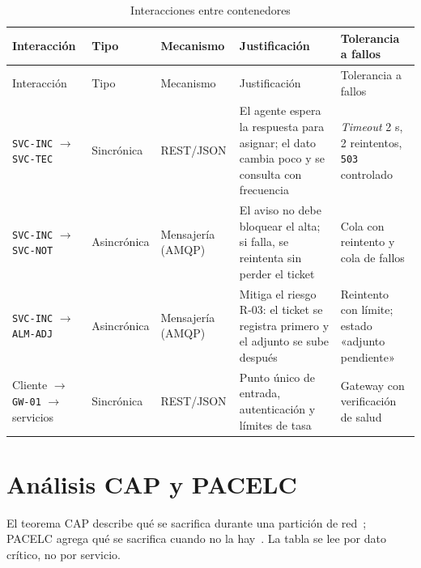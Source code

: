 \begin{longtable}{@{}p{2.5cm} p{1.9cm} p{1.9cm} p{3.9cm} p{3.9cm}@{}}
\caption{Interacciones entre contenedores}
\label{tab:comunicacion}\\
\toprule
Interacción & Tipo & Mecanismo & Justificación & Tolerancia a fallos \\
\midrule
\endfirsthead
\toprule
Interacción & Tipo & Mecanismo & Justificación & Tolerancia a fallos \\
\midrule
\endhead
\bottomrule
\endfoot
\texttt{SVC-INC} $\rightarrow$ \texttt{SVC-TEC}
& Sincrónica & REST/JSON & El agente espera la respuesta para asignar; el dato cambia poco y se
consulta con frecuencia & \emph{Timeout} 2 s, 2 reintentos, \texttt{503} controlado \\
\addlinespace
\texttt{SVC-INC} $\rightarrow$ \texttt{SVC-NOT}
& Asincrónica & Mensajería (AMQP) & El aviso no debe bloquear el alta; si falla, se reintenta sin
perder el ticket & Cola con reintento y cola de fallos \\
\addlinespace
\texttt{SVC-INC} $\rightarrow$ \texttt{ALM-ADJ}
& Asincrónica & Mensajería (AMQP) & Mitiga el riesgo R-03: el ticket se registra primero y el
adjunto se sube después & Reintento con límite; estado «adjunto pendiente» \\
\addlinespace
Cliente $\rightarrow$ \texttt{GW-01} $\rightarrow$ servicios
& Sincrónica & REST/JSON & Punto único de entrada, autenticación y límites de tasa & Gateway con
verificación de salud \\
\end{longtable}

\section{Análisis CAP y PACELC}
\label{sec:cap}

El teorema CAP describe qué se sacrifica durante una partición de red~\cite{gilbert2012}; PACELC
agrega qué se sacrifica cuando no la hay~\cite{abadi2012}. La tabla se lee por dato crítico, no por
servicio.

